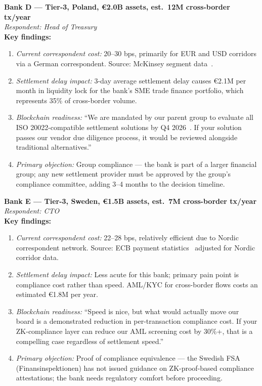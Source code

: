 \documentclass[11pt,a4paper]{article}
\begin{document}
\begin{tcolorbox}[boxbase, colback=white, colframe=accent!30]
\textbf{Bank D --- Tier-3, Poland, \euro 2.0B assets, est.\ 12M cross-border tx/year}\\[4pt]
\textit{Respondent: Head of Treasury}\\[4pt]
\textbf{Key findings:}
\begin{enumerate}[leftmargin=1.5em, itemsep=2pt, parsep=0pt]
\item \textit{Current correspondent cost:} 20--30 bps, primarily for EUR and USD corridors via a German correspondent. Source: McKinsey segment data~\cite{mckinsey_2024}.
\item \textit{Settlement delay impact:} 3-day average settlement delay causes \euro 2.1M per month in liquidity lock for the bank's SME trade finance portfolio, which represents 35\% of cross-border volume.
\item \textit{Blockchain readiness:} ``We are mandated by our parent group to evaluate all ISO 20022-compatible settlement solutions by Q4 2026~\cite{swift_iso20022}. If your solution passes our vendor due diligence process, it would be reviewed alongside traditional alternatives.''
\item \textit{Primary objection:} Group compliance --- the bank is part of a larger financial group; any new settlement provider must be approved by the group's compliance committee, adding 3--4 months to the decision timeline.
\end{enumerate}
\end{tcolorbox}

\begin{tcolorbox}[boxbase, colback=white, colframe=accent!30]
\textbf{Bank E --- Tier-3, Sweden, \euro 1.5B assets, est.\ 7M cross-border tx/year}\\[4pt]
\textit{Respondent: CTO}\\[4pt]
\textbf{Key findings:}
\begin{enumerate}[leftmargin=1.5em, itemsep=2pt, parsep=0pt]
\item \textit{Current correspondent cost:} 22--28 bps, relatively efficient due to Nordic correspondent network. Source: ECB payment statistics~\cite{ecb_payments} adjusted for Nordic corridor data.
\item \textit{Settlement delay impact:} Less acute for this bank; primary pain point is compliance cost rather than speed. AML/KYC for cross-border flows costs an estimated \euro 1.8M per year.
\item \textit{Blockchain readiness:} ``Speed is nice, but what would actually move our board is a demonstrated reduction in per-transaction compliance cost. If your ZK-compliance layer can reduce our AML screening cost by 30\%+, that is a compelling case regardless of settlement speed.''
\item \textit{Primary objection:} Proof of compliance equivalence --- the Swedish FSA (Finansinspektionen) has not issued guidance on ZK-proof-based compliance attestations; the bank needs regulatory comfort before proceeding.
\end{enumerate}
\end{tcolorbox}
\end{document}
